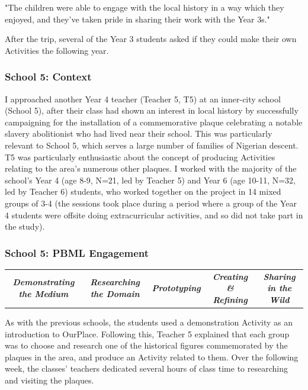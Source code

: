 \begin{displayquote}
"The children were able to engage with the local history in a way which they enjoyed, and they've taken pride in sharing their work with the Year 3s."
\end{displayquote}

After the trip, several of the Year 3 students asked if they could make their own Activities the following year.

\subsubsection{School 5: Context}

I approached another Year 4 teacher (Teacher 5, T5) at an inner-city school (School 5), after their class had shown an interest in local history by successfully campaigning for the installation of a commemorative plaque celebrating a notable slavery abolitionist who had lived near their school. This was particularly relevant to School 5, which serves a large number of families of Nigerian descent. T5 was particularly enthusiastic about the concept of producing Activities relating to the area's numerous other plaques. I worked with the majority of the school's Year 4 (age 8-9, N=21, led by Teacher 5) and Year 6 (age 10-11, N=32, led by Teacher 6) students, who worked together on the project in 14 mixed groups of 3-4 (the sessions took place during a period where a group of the Year 4 students were offsite doing extracurricular activities, and so did not take part in the study). 

\subsubsection{School 5: PBML Engagement}

\begin{table}[h]
    \centering
    \begin{tabulary}{\textwidth}{C|C|p{19mm}|C|C}
    \small\textit{\textbf{Demonstrating the Medium}} 
    & \small\textit{\textbf{Researching the Domain}}
    & \small\textit{\textbf{Prototyping}}
    & \small\textit{\textbf{Creating \& Refining}}
    & \small\textit{\textbf{Sharing in the Wild}}\\
\end{tabulary}
\end{table}

As with the previous schools, the students used a demonstration Activity as an introduction to OurPlace. Following this, Teacher 5 explained that each group was to choose and research one of the historical figures commemorated by the plaques in the area, and produce an Activity related to them. Over the following week, the classes' teachers dedicated several hours of class time to researching and visiting the plaques.

